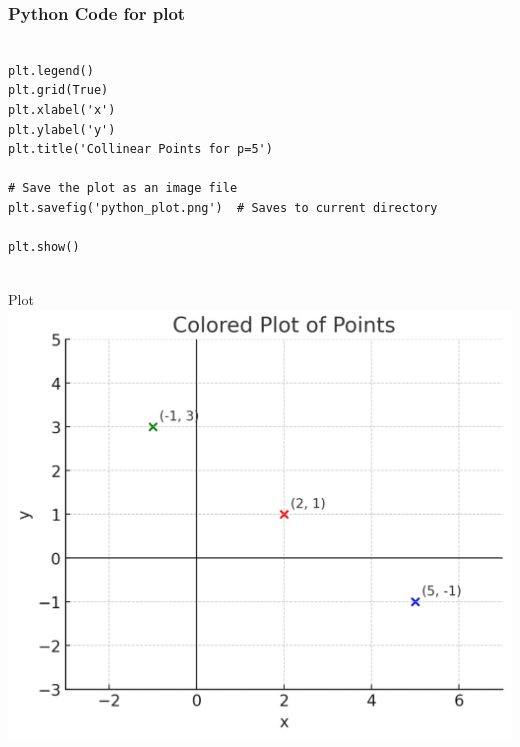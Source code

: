 \documentclass{beamer}
\begin{document}
\begin{frame}[fragile]
    \frametitle{Python Code for plot}
    \begin{lstlisting}

plt.legend()
plt.grid(True)
plt.xlabel('x')
plt.ylabel('y')
plt.title('Collinear Points for p=5')

# Save the plot as an image file
plt.savefig('python_plot.png')  # Saves to current directory

plt.show()


    \end{lstlisting}
\end{frame}




\begin{frame}{Plot}
    \centering
    \includegraphics[width=\columnwidth, height=0.8\textheight, keepaspectratio]{figs/python_plot.png}     
\end{frame}
\end{document}
